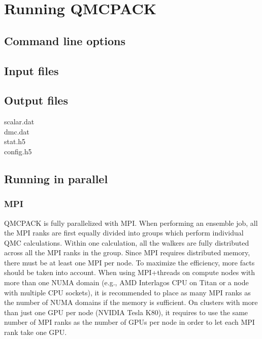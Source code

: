 \chapter{Running QMCPACK}
\label{chap:running}

\section{Command line options}
\label{sec:commandline}


\section{Input files}
\label{sec:inputs}

\section{Output files}
\label{sec:outputs}

  scalar.dat\\
  dmc.dat\\
  stat.h5\\
  config.h5

\section{Running in parallel}
\label{sec:parallelrunning}


\subsection{MPI}
QMCPACK is fully parallelized with MPI. When performing an ensemble job, all the MPI ranks are first equally divided into groups which perform individual QMC calculations. Within one calculation, all the walkers are fully distributed across all the MPI ranks in the group. Since MPI requires distributed memory, there must be at least one MPI per node. To maximize the efficiency, more facts should be taken into account. When using MPI+threads on compute nodes with more than one NUMA domain (e.g., AMD Interlagos CPU on Titan or a node with multiple CPU sockets), it is recommended to place as many MPI ranks as the number of NUMA domains if the memory is sufficient. On clusters with more than just one GPU per node (NVIDIA Tesla K80), it requires to use the same number of MPI ranks as the number of GPUs per node in order to let each MPI rank take one GPU.

